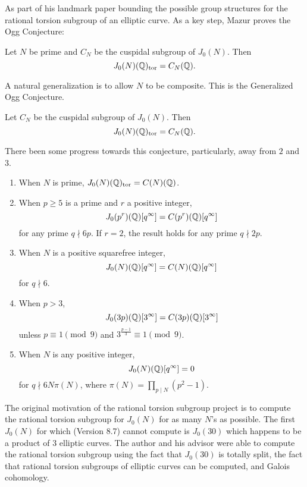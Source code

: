 As part of his landmark paper bounding the possible group structures for the
rational torsion subgroup of an elliptic curve. As a key step, Mazur proves the
Ogg Conjecture:
\begin{theorem}
    Let $N$ be prime and $C_N$ be the cuspidal subgroup of $J_0(N)$. Then
    \[
        J_0(N)(\mathbb{Q})_{\mathrm{tor}} = C_N(\mathbb{Q}).
    \]
\end{theorem}
A natural generalization is to allow $N$ to be composite. This is the
Generalized Ogg Conjecture.
\begin{conjecture}
    Let $C_N$ be the cuspidal subgroup of $J_0(N)$. Then
    \[
        J_0(N)(\mathbb{Q})_{\mathrm{tor}} = C_N(\mathbb{Q}).
    \]
\end{conjecture}
There been some progress towards this conjecture, particularly, away from $2$
and $3$.
\begin{enumerate}
    \item 
        When $N$ is prime, $J_0(N)(\mathbb{Q})_{\mathrm{tor}} =C(N)(\mathbb{Q})$.~\cite[Thm.
        1]{mazur:eisenstein}
    \item
        When $p\geq 5$ is a prime and $r$ a positive integer,
        \[
            J_0(p^r)(\mathbb{Q})[q^\infty] = C(p^r)(\mathbb{Q})[q^\infty]
        \]
        for any prime $q\nmid 6p$. If $r=2$, the result holds for any prime
        $q\nmid 2p$.~\cite[Thm. 4]{ling:cuspidal_pr}
    \item
        When $N$ is a positive squarefree integer,
        \[
            J_0(N)(\mathbb{Q})[q^\infty]=C(N)(\mathbb{Q})[q^\infty]
        \]
        for $q\nmid 6$.~\cite[Thm. 3.6.2]{ohta:rational_torsion_2}
    \item
        When $p>3$,
        \[
            J_0(3p)(\mathbb{Q})[3^\infty] = C(3p)(\mathbb{Q})[3^\infty]
        \]
        unless $p\equiv 1 \pmod{9}$ and $3^{\frac{p-1}{3}} \equiv 1
        \pmod{9}$.~\cite{yoo:rational}
    \item
        When $N$ is any positive integer,
        \[
            J_0(N)(\mathbb{Q})[q^\infty]=0
        \]
        for $q\nmid 6N\pi(N)$, where $\pi(N) = \prod_{p\mid N}
        (p^2-1)$.~\cite[Thm. 1.2]{ren:rational}
\end{enumerate}

The original motivation of the rational torsion subgroup project is to compute
the rational torsion subgroup for $J_0(N)$ for as many $N$'s as possible. The
first $J_0(N)$ for which \sage (Version 8.7) cannot compute is $J_0(30)$ which
happens to be a product of 3 elliptic curves. The author and his advisor were
able to compute the rational torsion subgroup using the fact that $J_0(30)$ is
totally split, the fact that rational torsion subgroups of elliptic curves can
be computed, and Galois cohomology.

